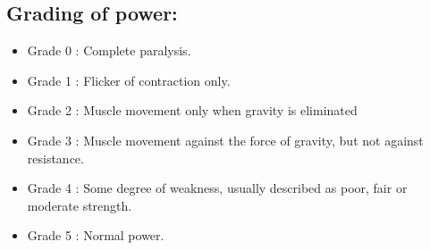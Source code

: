 \documentclass[a4paper,12pt,openany,oneside]{book}
\begin{document}
	\subsection*{Grading of power:}
	\begin{itemize}
			\itemsep0em
\item[]	Grade 0 	:	Complete paralysis. 
\item[]	Grade 1 	: 	Flicker of contraction only.
\item[]		Grade 2 	: Muscle movement only when gravity is eliminated
\item[]	Grade 3 	:	Muscle movement against the force of gravity, but not against resistance.
\item[]	Grade 4 :	Some degree of weakness, usually described as poor, fair or moderate 		strength.
\item[]	Grade 5 	:	Normal power.
	\end{itemize}
	
\end{document}
